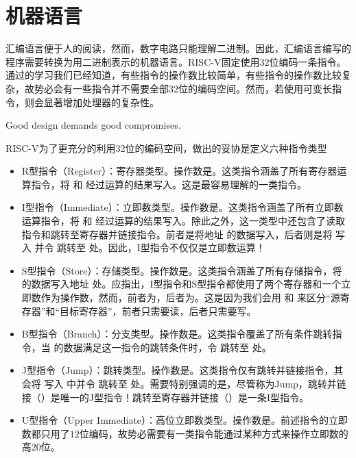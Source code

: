 \section{机器语言}

汇编语言便于人的阅读，然而，数字电路只能理解二进制。因此，汇编语言编写的程序需要转换为用二进制表示的机器语言。RISC-V固定使用$32$位编码一条指令。通过的学习我们已经知道，有些指令的操作数比较简单，有些指令的操作数比较复杂，故势必会有一些指令并不需要全部$32$位的编码空间。然而，若使用可变长指令，则会显著增加处理器的复杂性。
\begin{BoxDesignPrinciple}[好设计需要好妥协]
    \centering
    Good design demands good compromises.
\end{BoxDesignPrinciple}

RISC-V为了更充分的利用32位的编码空间，做出的妥协是定义六种指令类型
\begin{itemize}
    \item R型指令（Register）：寄存器类型。操作数是。这类指令涵盖了所有寄存器运算指令，将 和 经过运算的结果写入。这是最容易理解的一类指令。
    \item I型指令（Immediate）：立即数类型。操作数是。这类指令涵盖了所有立即数运算指令，将 和 经过运算的结果写入。除此之外，这一类型中还包含了读取指令和跳转至寄存器并链接指令。前者是将地址 的数据写入，后者则是将 写入 并令 跳转至 处。因此，I型指令不仅仅是立即数运算！
    \item S型指令（Store）：存储类型。操作数是。这类指令涵盖了所有存储指令，将 的数据写入地址 处。应指出，I型指令和S型指令都使用了两个寄存器和一个立即数作为操作数，然而，前者为，后者为。这是因为我们会用 和 来区分“源寄存器”和“目标寄存器”，前者只需要读，后者只需要写。
    \item B型指令（Branch）：分支类型。操作数是。这类指令覆盖了所有条件跳转指令，当 的数据满足这一指令的跳转条件时，令 跳转至 处。
    \item J型指令（Jump）：跳转类型。操作数是。这类指令仅有跳转并链接指令，其会将 写入 中并令 跳转至 处。需要特别强调的是，尽管称为Jump，跳转并链接（）是唯一的J型指令！跳转至寄存器并链接（）是一条I型指令。
    \item U型指令（Upper Immediate）：高位立即数类型。操作数是。前述指令的立即数都只用了$12$位编码，故势必需要有一类指令能通过某种方式来操作立即数的高$20$位。
\end{itemize}

